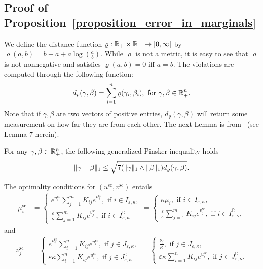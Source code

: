 \subsection{Proof of Proposition~\ref{proposition_error_in_marginals}}

We define the distance function $\varrho: {\mathbb{R}}_+ \times {\mathbb{R}}_+ \mapsto [0, \infty]$ by $\varrho(a,b) = b - a + a \log(\frac ab).$
While $\varrho$ is not a metric, it is easy to see that $\varrho$ is not nonnegative and satisfies $\varrho(a,b) =0$ iff $a=b$.
The violations are computed through the following function: 
\begin{equation*}
	d_{\varrho}(\gamma,\beta) = \sum_{i=1}^n \varrho(\gamma_i,\beta_i), \text{ for } \gamma, \beta \in {\mathbb{R}}^n_+.
\end{equation*}
Note that if $\gamma,\beta$ are two vectors of positive entries, $d_{\varrho}(\gamma,\beta)$ will return some measurement on how far they are from each other. The next Lemma is from~\cite{khalilabid2018} (see Lemma 7 herein).
\begin{lemma}
\label{lem:pinsker}
For any $\gamma, \beta \in {\mathbb{R}}^n_+$, the following generalized Pinsker inequality holds 
\begin{align*}
\|\gamma - \beta\|_1 \leq \sqrt{7 (\|\gamma\|_1\wedge \|\beta\|_1)d_{\varrho}(\gamma,\beta)}.
\end{align*}
\end{lemma}

The optimality conditions for $({u}^{\text{sc}}, {v}^{\text{sc}})$ entails 
\begin{align}
\label{i-th-marginal-mu} 
{\mu}^{\text{sc}}_i  &= 
\begin{cases}
e^{u^{\text{sc}}_i} \sum_{j=1}^m K_{ij} e^{v^{\text{sc}}_j}, \text{ if  }i \in I_{\varepsilon,\kappa},\\
\frac \varepsilon\kappa\sum_{j=1}^m K_{ij} e^{v^{\text{sc}}_j}, \text{ if  }i \in I^\complement_{\varepsilon,\kappa}
\end{cases}
=\begin{cases}
\kappa \mu_i, \text{ if  }i \in I_{\varepsilon,\kappa},\\
\frac \varepsilon\kappa\sum_{j=1}^m K_{ij} e^{v^{\text{sc}}_j}, \text{ if  }i \in I^\complement_{\varepsilon,\kappa},
\end{cases}
\end{align}
and 
\begin{align}
\label{i-th-marginal-nu}
{\nu}^{\text{sc}}_j  &= 
\begin{cases}
e^{v^{\text{sc}}_j} \sum_{i=1}^n K_{ij} e^{u^{\text{sc}}_i}, \text{ if  }j \in J_{\varepsilon,\kappa},\\
\varepsilon\kappa\sum_{i=1}^n K_{ij} e^{u^{\text{sc}}_i}, \text{ if  }j \in J^\complement_{\varepsilon,\kappa}
\end{cases}
=\begin{cases}
\frac{\nu_j}{\kappa}, \text{ if  }j \in J_{\varepsilon,\kappa},\\
\varepsilon\kappa\sum_{i=1}^n K_{ij} e^{u^{\text{sc}}_i}, \text{ if  }j \in J^\complement_{\varepsilon,\kappa}.
\end{cases}
\end{align}

